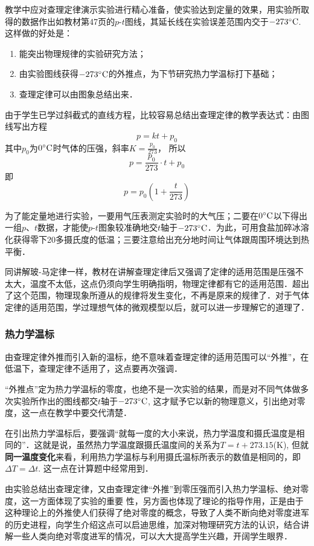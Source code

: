 教学中应对查理定律演示实验进行精心准备，使实验达到定量的效果，用实验所取得的数据作出如教材第47页的$p$-$t$图线，其延长线在实验误差范围内交于$-273^{\circ}{\rm C}$. 这样做的好处是：
 \begin{enumerate}
     \item 能突出物理规律的实验研究方法；
     \item 由实验图线获得$-273^{\circ}{\rm C}$的外推点，为下节研究热力学温标打下基础；
     \item 查理定律可以由图象总结出来．
 \end{enumerate}

 由于学生已学过斜截式的直线方程，比较容易总结出查理定律的教学表达式：由图线写出方程
\[p=kt+p_0\]
其中$p_0$为$0^{\circ}{\rm C}$时气体的压强，斜率$K=\frac{p_0}{273}$，
所以
\[p=\frac{p_0}{273}\cdot t+p_0\]
即
\[p=p_0\left(1+\frac{t}{273}\right)\]

为了能定量地进行实验，一要用气压表测定实验时的大气压；二要在$0^{\circ}{\rm C}$以下得出一组$p$、$t$数据，才能使$p$-$t$图象较准确地交$t$轴于${\rm -273^{\circ}C}$．为此，可用食盐加碎冰溶化获得零下20多摄氏度的低温；三要注意给出充分地时间让气体跟周围环境达到热平衡．

同讲解玻-马定律一样，教材在讲解查理定律后又强调了定律的适用范围是压强不太大，温度不太低，这点仍须向学生明确指明，物理定律都有它的适用范围．超出了这个范围，物理现象所遵从的规律将发生变化，不再是原来的规律了．对于气体定律的适用范围，学过理想气体的微观模型以后，就可以进一步理解它的道理了．

\subsubsection{热力学温标}

由查理定律外推而引入新的温标，绝不意味着查理定律的适用范围可以“外推”，在低温下，查理定律不适用了，这点要再次强调．

“外推点”定为热力学温标的零度，也绝不是一次实验的结果，而是对不同气体做多次实验所作出的图线都交$t$轴于${\rm -273^{\circ}C}$, 这才赋予它以新的物理意义，引出绝对零度，这一点在教学中要交代清楚．

在引出热力学温标后，要强调“就每一度的大小来说，热力学温度和摄氏温度是相同的”．这就是说，虽然热力学温度跟摄氏温度间的关系为$T=t+273.15$(K), 但就\textbf{同一温度变化}来看，利用热力学温标与利用摄氏温标所表示的数值是相同的，即$\Delta T=\Delta t$. 这一点在计算题中经常用到．

由实验总结出查理定律，又由查理定律“外推”到零压强而引入热力学温标、绝对零度，这一方面体现了实验的重要
性，另方面也体现了理论的指导作用，正是由于这种理论上的外推使人们获得了绝对零度的概念，导致了人类不断向绝对零度进军的历史进程，向学生介绍这点可以启迪思维，加深对物理研究方法的认识，结合讲解一些人类向绝对零度进军的情况，可以大大提高学生兴趣，开阔学生眼界．

